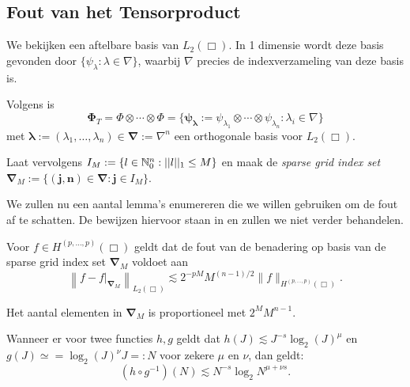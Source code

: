 \subsection{Fout van het Tensorproduct}
We bekijken een aftelbare basis van $L_2(\Box)$. In 1 dimensie wordt deze basis gevonden door $\{ \psi_\lambda: \lambda \in \nabla \}$, waarbij $\nabla$ precies de indexverzameling van deze basis is.

Volgens \cite[L3.1.7]{tammo} is 
\[ 
  \boldsymbol\Phi_T = \Phi \otimes \cdots \otimes \Phi = \{ \boldsymbol{\psi_\lambda} := \psi_{\lambda_1} \otimes \cdots \otimes \psi_{\lambda_n}: \lambda_i \in \nabla \}
\]
met $\boldsymbol\lambda := (\lambda_1, \ldots, \lambda_n) \in \boldsymbol{\nabla} := \nabla^n$ een orthogonale basis voor $L_2(\Box)$.

Laat vervolgens $I_M := \{ l \in \mathbb{N}^n_0: ||l||_1 \leq M \}$ en maak de \emph{sparse grid index set} \mbox{$\boldsymbol{\nabla}_M := \{ \boldsymbol{(j,n)} \in \boldsymbol{\nabla}: \boldsymbol{j} \in I_M \}$}.

We zullen nu een aantal lemma's enumereren die we willen gebruiken om de fout af te schatten. De bewijzen hiervoor
staan in \cite{tammo} en zullen we niet verder behandelen.
\begin{lemm}{\cite[P3.2.3]{tammo}}
  \label{en_daarom_jongens_en_meisjes}
  Voor $f \in H^{(p,\ldots,p)}(\Box)$ geldt dat de fout van de benadering op basis van de sparse grid index set $\boldsymbol{\nabla}_M$ voldoet aan
  \[
  \left\| f - f|_{\boldsymbol\nabla_M} \right\|_{L_2(\Box)} \lesssim 2^{-pM} M^{(n-1)/2} \| f \|_{H^{(p,\ldots,p)}(\Box)}.
  \]
\end{lemm}
\begin{lemm}{\cite[L3.3.1]{tammo}}
  \label{gebruiken_we_referenties}
  Het aantal elementen in $\boldsymbol{\nabla}_M$ is proportioneel met $2^M M^{n-1}$.
\end{lemm}
\begin{lemm}{\cite[L3.4.1]{tammo}}
  \label{want_dit_werkt_goed_zo}
  Wanneer er voor twee functies $h, g$ geldt dat $h(J) \lesssim J^{-s}\log_2(J)^\mu$ en $g(J) \simeq= \log_2(J)^\nu J =: N$ voor zekere $\mu$ en $\nu$, dan geldt:
  \[
  (h \circ g^{-1})(N) \lesssim N^{-s} \log_2{N}^{\mu + \nu s}.
  \]
\end{lemm}


